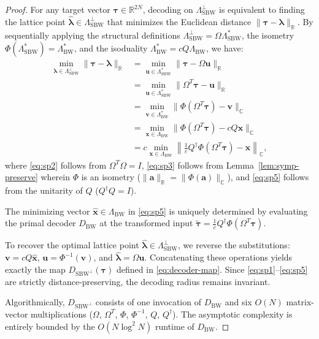 \documentclass[aps,prl,twocolumn,superscriptaddress]{revtex4-2}
\newcommand{\symp}{\Omega}
\newcommand{\bvec}[1]{\boldsymbol{#1}}
\begin{document}
\begin{proof}
For any target vector $\bvec{\tau} \in \mathbb{R}^{2N}$, decoding on $\Lambda_{\mathrm{SBW}}^\perp$ is equivalent to finding the lattice point $\hat{\bvec{\lambda}} \in \Lambda_{\mathrm{SBW}}^\perp$ that minimizes the Euclidean distance $\|\bvec{\tau} - \bvec{\lambda}\|_{\mathbb{R}}$. By sequentially applying the structural definitions $\Lambda_{\mathrm{SBW}}^\perp = \symp \Lambda_{\mathrm{SBW}}^*$, the isometry $\Phi(\Lambda_{\mathrm{SBW}}^*) = \Lambda_{\mathrm{BW}}^*$, and the isoduality $\Lambda_{\mathrm{BW}}^* = c Q \Lambda_{\mathrm{BW}}$, we have:
\begin{align}
\min_{\bvec{\lambda} \in \Lambda_{\mathrm{SBW}}^\perp} \|\bvec{\tau} - \bvec{\lambda}\|_{\mathbb{R}}
&= \min_{\bvec{u} \in \Lambda_{\mathrm{SBW}}^*} \|\bvec{\tau} - \symp \bvec{u}\|_{\mathbb{R}} \label{eq:sp1} \\
&= \min_{\bvec{u} \in \Lambda_{\mathrm{SBW}}^*} \|\symp^T \bvec{\tau} - \bvec{u}\|_{\mathbb{R}} \label{eq:sp2} \\
&= \min_{\bvec{v} \in \Lambda_{\mathrm{BW}}^*} \|\Phi(\symp^T \bvec{\tau}) - \bvec{v}\|_{\mathbb{C}} \label{eq:sp3} \\
&= \min_{\bvec{x} \in \Lambda_{\mathrm{BW}}} \|\Phi(\symp^T \bvec{\tau}) - c Q \bvec{x}\|_{\mathbb{C}} \label{eq:sp4} \\
&= c \min_{\bvec{x} \in \Lambda_{\mathrm{BW}}} \left\| \frac{1}{c}Q^\dagger \Phi(\symp^T \bvec{\tau}) - \bvec{x} \right\|_{\mathbb{C}}, \label{eq:sp5}
\end{align}
where \eqref{eq:sp2} follows from $\symp^T\symp = I$, \eqref{eq:sp3} follows from Lemma~\ref{lem:symp-preserve} wherein $\Phi$ is an isometry ($\|\bvec{a}\|_{\mathbb{R}} = \|\Phi(\bvec{a})\|_{\mathbb{C}}$), and \eqref{eq:sp5} follows from the unitarity of $Q$ ($Q^\dagger Q = I$).

The minimizing vector $\hat{\bvec{x}} \in \Lambda_{\mathrm{BW}}$ in \eqref{eq:sp5} is uniquely determined by evaluating the primal decoder $D_{\mathrm{BW}}$ at the transformed input $\tilde{\bvec{\tau}} = \frac{1}{c}Q^\dagger \Phi(\symp^T \bvec{\tau})$.

To recover the optimal lattice point $\hat{\bvec{\lambda}} \in \Lambda_{\mathrm{SBW}}^\perp$, we reverse the substitutions: $\bvec{v} = c Q \hat{\bvec{x}}$, $\bvec{u} = \Phi^{-1}(\bvec{v})$, and $\hat{\bvec{\lambda}} = \symp \bvec{u}$. Concatenating these operations yields exactly the map $D_{\mathrm{SBW}^\perp}(\bvec{\tau})$ defined in \eqref{eq:decoder-map}. Since \eqref{eq:sp1}--\eqref{eq:sp5} are strictly distance-preserving, the decoding radius remains invariant.

Algorithmically, $D_{\mathrm{SBW}^\perp}$ consists of one invocation of $D_{\mathrm{BW}}$ and six $O(N)$ matrix-vector multiplications ($\symp$, $\symp^T$, $\Phi$, $\Phi^{-1}$, $Q$, $Q^\dagger$). The asymptotic complexity is entirely bounded by the $O(N \log^2 N)$ runtime of $D_{\mathrm{BW}}$.
\end{proof}
\end{document}
